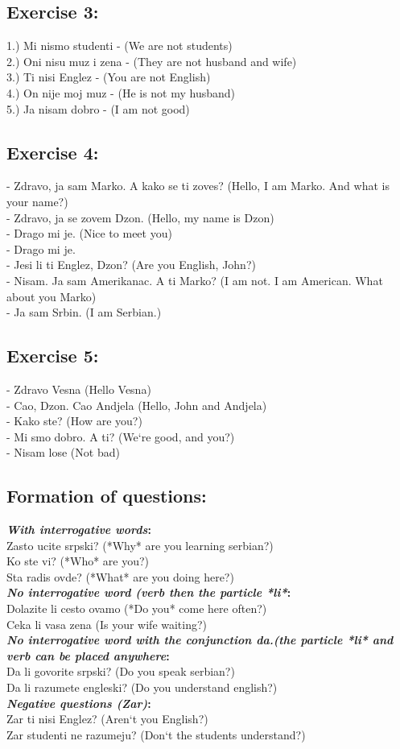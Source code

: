 \documentclass[12pt,
               a4paper,
               article,
               oneside,
               english,oldfontcommands]{memoir}
\newcommand{\spaze}{\vspace{4mm}\\}
\begin{document}
  \subsection*{Exercise 3:}
  1.) Mi nismo studenti - (We are not students) \spaze 
  2.) Oni nisu muz i zena - (They are not husband and wife) \spaze 
  3.) Ti nisi Englez - (You are not English) \spaze 
  4.) On nije moj muz - (He is not my husband) \spaze 
  5.) Ja nisam dobro - (I am not good) \spaze  
  \subsection*{Exercise 4:} 
  - Zdravo, ja sam Marko. A kako se ti zoves? (Hello, I am Marko. And what is your name?) \spaze 
  - Zdravo, ja se zovem Dzon. (Hello, my name is Dzon) \spaze 
  - Drago mi je. (Nice to meet you) \spaze 
  - Drago mi je. \spaze 
  - Jesi li ti Englez, Dzon? (Are you English, John?) \spaze 
  - Nisam. Ja sam Amerikanac. A ti Marko? (I am not. I am American. What about you Marko) \spaze 
  - Ja sam Srbin. (I am Serbian.) 
  \subsection*{Exercise 5:}
  - Zdravo Vesna (Hello Vesna) \spaze 
  - Cao, Dzon. Cao Andjela (Hello, John and Andjela) \spaze 
  - Kako ste? (How are you?) \spaze
  - Mi smo dobro. A ti? (We`re good, and you?) \spaze
  - Nisam lose (Not bad) \spaze
  \subsection*{Formation of questions:} 
  \textbf{\textit{With interrogative words}:} \spaze 
  Zasto ucite srpski? (*Why* are you learning serbian?) \spaze 
  Ko ste vi? (*Who* are you?) \spaze 
  Sta radis ovde? (*What* are you doing here?)\spaze 
   \textbf{\textit{No interrogative word (verb then the particle *li*}:} \spaze 
   Dolazite li cesto ovamo (*Do you* come here often?) \spaze 
   Ceka li vasa zena (Is your wife waiting?) \spaze 
    \textbf{\textit{No interrogative word with the conjunction da.(the particle *li* and verb can be placed anywhere}:}\spaze 
    Da li govorite srpski? (Do you speak serbian?) \spaze 
    Da li razumete engleski? (Do you understand english?) \spaze 
     \textbf{\textit{Negative questions (Zar)}:}\spaze
     Zar ti nisi Englez? (Aren`t you English?) \spaze 
     Zar studenti ne razumeju? (Don`t the students understand?)\spaze 
\end{document}
